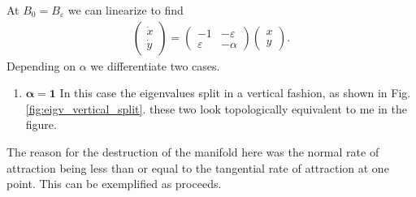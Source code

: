 \begin{ex}[]
	At $B_0 = B_{\varepsilon}$ we can linearize to find
	\begin{align}
		\begin{pmatrix}
			\dot{x} \\ \dot{y}
		\end{pmatrix}
		 = 
		 \begin{pmatrix}
			 -1 & - \varepsilon \\
			 \varepsilon & -\alpha 
		 \end{pmatrix}
		 \begin{pmatrix}
		 	x \\ y
		 \end{pmatrix}
		. 
	\end{align}
Depending on $\alpha $ we differentiate two cases.
\begin{enumerate}
	\item $\bm{\alpha =1} $ In this case the eigenvalues split in a vertical fashion, as shown in Fig. \ref{fig:eigv_vertical_split}. {\color{blue} these two look topologically equivalent to me in the figure}.
\end{enumerate}

\end{ex}

The reason for the destruction of the manifold here was the normal rate of attraction being less than or equal to the tangential rate of attraction at one point. This can be exemplified as proceeds.

